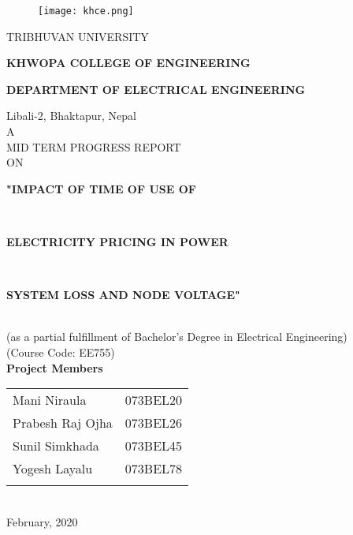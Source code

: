 \documentclass[14 pt]{article}
\begin{document}
\begin{titlepage}
\begin{figure}[H]

\centering
\texttt{[image: khce.png]}
\end{figure}

\smallskip
\begin{center}
TRIBHUVAN UNIVERSITY\\
\begin{LARGE}
\textbf{KHWOPA COLLEGE OF ENGINEERING}\\
\end{LARGE}
\onehalfspacing
\begin{large}
\textbf{DEPARTMENT OF ELECTRICAL ENGINEERING}\\
\end{large}
\smallskip
Libali-2, Bhaktapur, Nepal\\
\vspace{2.54cm}
A\\
\smallskip
MID TERM PROGRESS REPORT\\
\smallskip
ON\\
\smallskip
\begin{LARGE}
\textbf{"IMPACT OF TIME OF USE OF}
\end{LARGE}\\
\smallskip

\begin{LARGE}
\textbf{ELECTRICITY PRICING IN POWER}
\end{LARGE}\\
\smallskip
\begin{LARGE}
\textbf{SYSTEM LOSS AND NODE VOLTAGE"}
\end{LARGE}\\
\smallskip
(as a partial fulfillment of Bachelor's Degree in Electrical Engineering)\\
\smallskip
(Course Code: EE755)\\
\vspace{3cm}
\smallskip
\textbf{Project Members}\\
\smallskip
\begin{tabular}{ll}
Mani Niraula & 073BEL20\\
\smallskip
Prabesh Raj Ojha & 073BEL26\\
\smallskip
Sunil Simkhada & 073BEL45\\
\smallskip
Yogesh Layalu & 073BEL78\\
\smallskip
\end{tabular}\\
\vspace{3cm}
February, 2020





\end{center}

\end{titlepage}
\end{document}
